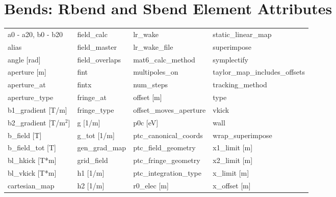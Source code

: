  \section{Bends: Rbend and Sbend Element Attributes}
 \label{s:list.bend}
 
 \begin{tabular}{llll} \toprule
a0 - a20, b0 - b20               & field_calc                       & lr_wake                          & static_linear_map                \\
alias                            & field_master                     & lr_wake_file                     & superimpose                      \\
angle [rad]                      & field_overlaps                   & mat6_calc_method                 & symplectify                      \\
aperture [m]                     & fint                             & multipoles_on                    & taylor_map_includes_offsets      \\
aperture_at                      & fintx                            & num_steps                        & tracking_method                  \\
aperture_type                    & fringe_at                        & offset [m]                       & type                             \\
b1_gradient [T/m]                & fringe_type                      & offset_moves_aperture            & vkick                            \\
b2_gradient [T/m$^2$]            & g [1/m]                          & p0c [eV]                         & wall                             \\
b_field [T]                      & g_tot [1/m]                      & ptc_canonical_coords             & wrap_superimpose                 \\
b_field_tot [T]                  & gen_grad_map                     & ptc_field_geometry               & x1_limit [m]                     \\
bl_hkick [T*m]                   & grid_field                       & ptc_fringe_geometry              & x2_limit [m]                     \\
bl_vkick [T*m]                   & h1 [1/m]                         & ptc_integration_type             & x_limit [m]                      \\
cartesian_map                    & h2 [1/m]                         & r0_elec [m]                      & x_offset [m]                     \\

\end{tabular}
